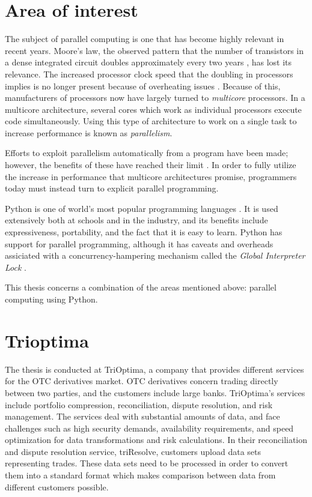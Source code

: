 \section{Area of interest}
The subject of parallel computing is one that has become highly relevant in recent years.
Moore's law, the observed pattern that the number of transistors in a dense integrated circuit doubles approximately every two
years \cite{moore_1998_cramming_cmcoic},
has lost its relevance. The increased processor clock speed that the doubling in processors implies is no longer present because of
overheating issues \cite[p. 1]{herlihy_2012_art_taomprr}. Because of this, manufacturers of processors now have
largely turned to \emph{multicore} processors. In a multicore architecture, several cores which work as individual processors execute
code simultaneously. Using this type of architecture to work on a single task to increase performance is known as \emph{parallelism}.

Efforts to exploit parallelism automatically from a program have been made; however, the benefits of these have reached their
limit \cite[p. 7-12]{mccool_2012_structured_spppfec}. In order to fully utilize the increase in performance that multicore
architectures promise, programmers today must instead turn to explicit parallel programming.

Python is one of world's most popular programming languages \cite{krill_2015_python_psnhilp}. It is used extensively both at schools and
in the industry, and its benefits include expressiveness, portability, and the fact that it is easy to learn. Python has support for
parallel programming, although it has caveats and overheads assiciated with a concurrency-hampering mechanism called the
\emph{Global Interpreter Lock} \cite{beazley_150745UTC_introduction_aitpc}.

This thesis concerns a combination of the areas mentioned above: parallel computing using Python.

\section{Trioptima}
The thesis is conducted at TriOptima, a company that provides different services for the OTC derivatives market.
OTC derivatives concern trading directly between two parties, and the customers include large banks. TriOptima’s services
include portfolio compression, reconciliation, dispute resolution, and risk management. The services deal with substantial
amounts of data, and face challenges such as high security demands, availability requirements, and speed optimization
for data transformations and risk calculations. In their reconciliation and dispute resolution service,
triResolve, customers upload data sets representing trades. These data sets need to be processed in order to convert
them into a standard format which makes comparison between data from different customers possible.

